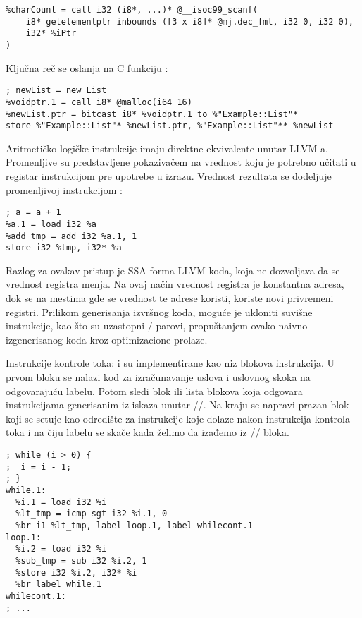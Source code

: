 \begin{lstlisting}
%charCount = call i32 (i8*, ...)* @__isoc99_scanf(
    i8* getelementptr inbounds ([3 x i8]* @mj.dec_fmt, i32 0, i32 0),
    i32* %iPtr
)
\end{lstlisting}

Ključna reč  se oslanja na C funkciju :

\begin{lstlisting}
; newList = new List
%voidptr.1 = call i8* @malloc(i64 16)
%newList.ptr = bitcast i8* %voidptr.1 to %"Example::List"*
store %"Example::List"* %newList.ptr, %"Example::List"** %newList
\end{lstlisting}

Aritmetičko-logičke instrukcije imaju direktne ekvivalente unutar LLVM-a.
Promenljive su predstavljene pokazivačem na vrednost koju je potrebno učitati u registar instrukcijom  pre upotrebe u izrazu.
Vrednost rezultata se dodeljuje promenljivoj instrukcijom :

\begin{lstlisting}
; a = a + 1
%a.1 = load i32 %a
%add_tmp = add i32 %a.1, 1
store i32 %tmp, i32* %a
\end{lstlisting}

Razlog za ovakav pristup je SSA forma LLVM koda, koja ne dozvoljava da se vrednost registra menja.
Na ovaj način vrednost registra  je konstantna adresa, dok se na mestima gde se vrednost te adrese koristi, koriste novi privremeni registri.
Prilikom generisanja izvršnog koda, moguće je ukloniti suvišne instrukcije, kao što su uzastopni / parovi, propuštanjem ovako naivno izgenerisanog koda kroz optimizacione prolaze.

Instrukcije kontrole toka:  i  su implementirane kao niz blokova instrukcija.
U prvom bloku se nalazi kod za izračunavanje uslova i uslovnog skoka na odgovarajuću labelu.
Potom sledi blok ili lista blokova koja odgovara instrukcijama generisanim iz iskaza unutar //.
Na kraju se napravi prazan blok koji se setuje kao odredište za instrukcije koje dolaze nakon instrukcija kontrola toka i na čiju labelu se skače kada želimo da izađemo iz // bloka.

\begin{lstlisting}
; while (i > 0) {
;  i = i - 1;
; }
while.1:
  %i.1 = load i32 %i
  %lt_tmp = icmp sgt i32 %i.1, 0
  %br i1 %lt_tmp, label loop.1, label whilecont.1
loop.1:
  %i.2 = load i32 %i
  %sub_tmp = sub i32 %i.2, 1
  %store i32 %i.2, i32* %i
  %br label while.1
whilecont.1:
; ...
\end{lstlisting}

